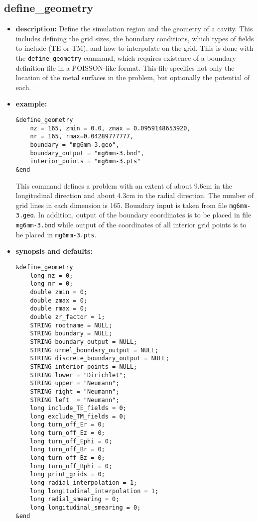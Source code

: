 
\newpage

\subsection{define\_geometry}
\label{define_geometry}

\begin{itemize}

\item {\bf description:}
Define the simulation region and the geometry of a cavity.  This
includes defining the grid sizes, the boundary conditions, which types
of fields to include (TE or TM), and how to interpolate on the grid.
This is done with the {\tt define\_geometry} command, which requires
existence of a boundary definition file in a POISSON-like format.
This file specifies not only the location of the metal surfaces
in the problem, but optionally the potential of each.

\item {\bf example:} 
\begin{verbatim}
&define_geometry
    nz = 165, zmin = 0.0, zmax = 0.0959148653920, 
    nr = 165, rmax=0.04289777777,
    boundary = "mg6mm-3.geo", 
    boundary_output = "mg6mm-3.bnd",
    interior_points = "mg6mm-3.pts"
&end
\end{verbatim}
This command defines a problem with an extent of about 9.6cm
in the longitudinal direction and about 4.3cm in the radial
direction.  The number of grid lines in each dimension is
165.  Boundary input is taken from file {\tt mg6mm-3.geo}.
In addition, output of the boundary coordinates is to be
placed in file {\tt mg6mm-3.bnd} while output of the coordinates
of all interior grid points is to be placed in {\tt mg6mm-3.pts}.
 
\item {\bf synopsis and defaults:} 
\begin{verbatim}
&define_geometry
    long nz = 0;
    long nr = 0;
    double zmin = 0;
    double zmax = 0;
    double rmax = 0;
    double zr_factor = 1;
    STRING rootname = NULL;
    STRING boundary = NULL;
    STRING boundary_output = NULL;
    STRING urmel_boundary_output = NULL; 
    STRING discrete_boundary_output = NULL;
    STRING interior_points = NULL;
    STRING lower = "Dirichlet";
    STRING upper = "Neumann";
    STRING right = "Neumann";
    STRING left  = "Neumann";
    long include_TE_fields = 0;
    long exclude_TM_fields = 0;
    long turn_off_Er = 0;
    long turn_off_Ez = 0;
    long turn_off_Ephi = 0;
    long turn_off_Br = 0;
    long turn_off_Bz = 0;
    long turn_off_Bphi = 0;
    long print_grids = 0;
    long radial_interpolation = 1;
    long longitudinal_interpolation = 1;
    long radial_smearing = 0;
    long longitudinal_smearing = 0;
&end
\end{verbatim}


\end{itemize}
